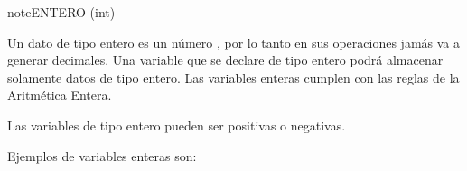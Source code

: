 \documentclass[letterpaper,10pt,spanish]{sphinxmanual}
\begin{document}
\begin{sphinxadmonition}{note}{ENTERO (int)}

\sphinxAtStartPar
Un dato de tipo entero es un número , por lo tanto en sus operaciones jamás va a generar decimales. Una variable que se declare de tipo entero podrá almacenar solamente datos de tipo entero. Las variables enteras cumplen con las reglas de la Aritmética Entera.

\sphinxAtStartPar
Las variables de tipo entero pueden ser positivas o negativas.

\sphinxAtStartPar
Ejemplos de variables enteras son:

\begin{sphinxVerbatim}[commandchars=\\\{\},numbers=left,firstnumber=1,stepnumber=1]
  
  
  
  
  
  
\end{sphinxVerbatim}
\end{sphinxadmonition}
\end{document}
